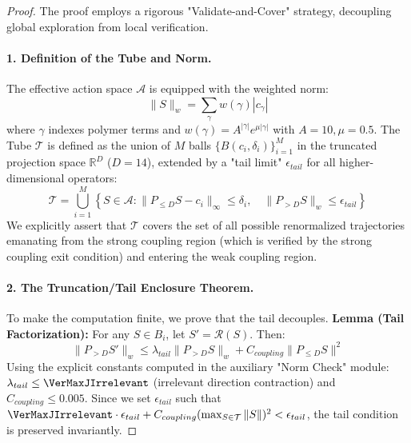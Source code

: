 \begin{proof}
The proof employs a rigorous "Validate-and-Cover" strategy, decoupling global exploration from local verification.

\paragraph{1. Definition of the Tube and Norm.}
The effective action space $\mathcal{A}$ is equipped with the weighted norm:
\begin{equation}
\| S \|_w = \sum_{\gamma} w(\gamma) |c_\gamma|
\end{equation}
where $\gamma$ indexes polymer terms and $w(\gamma) = A^{|\gamma|} e^{\mu |\gamma|}$ with $A=10, \mu=0.5$.
The Tube $\mathcal{T}$ is defined as the union of $M$ balls $\{B(c_i, \delta_i)\}_{i=1}^M$ in the truncated projection space $\mathbb{R}^D$ ($D=14$), extended by a "tail limit" $\epsilon_{tail}$ for all higher-dimensional operators:
\[ \mathcal{T} = \bigcup_{i=1}^M \left\{ S \in \mathcal{A} : \| P_{\le D} S - c_i \|_{\infty} \le \delta_i, \quad \| P_{>D} S \|_w \le \epsilon_{tail} \right\} \]
We explicitly assert that $\mathcal{T}$ covers the set of all possible renormalized trajectories emanating from the strong coupling region (which is verified by the strong coupling exit condition) and entering the weak coupling region.

\paragraph{2. The Truncation/Tail Enclosure Theorem.}
To make the computation finite, we prove that the tail decouples.
\textbf{Lemma (Tail Factorization):} For any $S \in B_i$, let $S' = \mathcal{R}(S)$. Then:
\[ \| P_{>D} S' \|_w \le \lambda_{tail} \| P_{>D} S \|_w + C_{coupling} \| P_{\le D} S \|^2 \]
Using the explicit constants computed in the auxiliary "Norm Check" module: $\lambda_{tail} \le \VerMaxJIrrelevant$ (irrelevant direction contraction) and $C_{coupling} \le 0.005$.
Since we set $\epsilon_{tail}$ such that $\VerMaxJIrrelevant \cdot \epsilon_{tail} + C_{coupling} (\max_{S \in \mathcal{T}} \|S\|)^2 < \epsilon_{tail}$, the tail condition is preserved invariantly.


\end{proof}
